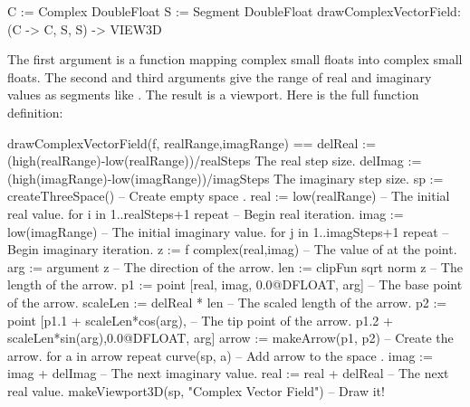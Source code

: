 \begin{xmpLinesNoReset}
C := Complex DoubleFloat
S := Segment DoubleFloat
drawComplexVectorField: (C -> C, S, S) -> VIEW3D
\end{xmpLinesNoReset}

The first argument is a function mapping complex small floats into
complex small floats.
The second and third arguments give the range of real and
imaginary values as segments like .
The result is a \threedim{} viewport.
Here is the full function definition:

\begin{xmpLinesNoReset}
drawComplexVectorField(f, realRange,imagRange) ==
  delReal := (high(realRange)-low(realRange))/realSteps The real step size.
  delImag := (high(imagRange)-low(imagRange))/imagSteps The imaginary step size.
  sp := createThreeSpace()                           -- Create empty space .
  real := low(realRange)                             -- The initial real value.
  for i in 1..realSteps+1 repeat                     -- Begin real iteration.
    imag := low(imagRange)                           -- The initial imaginary value.
    for j in 1..imagSteps+1 repeat                   -- Begin imaginary iteration.
      z := f complex(real,imag)                      -- The value of  at the point.
      arg := argument z                              -- The direction of the arrow.
      len := clipFun sqrt norm z                     -- The length of the arrow.
      p1 :=  point [real, imag, 0.0@DFLOAT, arg]     -- The base point of the arrow.
      scaleLen := delReal * len                      -- The scaled length of the arrow.
      p2 := point [p1.1 + scaleLen*cos(arg),         -- The tip point of the arrow.
                   p1.2 + scaleLen*sin(arg),0.0@DFLOAT, arg]
      arrow := makeArrow(p1, p2)                     -- Create the arrow.
      for a in arrow repeat curve(sp, a)             -- Add arrow to the space .
      imag := imag + delImag                         -- The next imaginary value.
    real := real + delReal                           -- The next real value.
  makeViewport3D(sp, "Complex Vector Field")         -- Draw it!
\end{xmpLinesNoReset}

